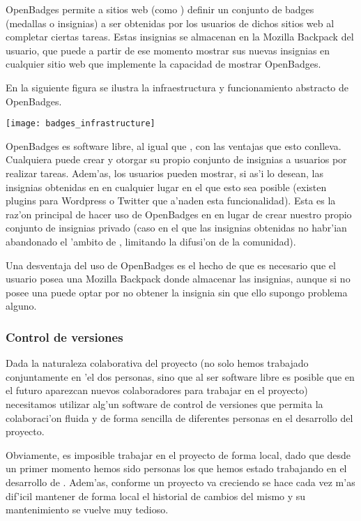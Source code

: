 OpenBadges permite a sitios web (como \Nipponline{}) definir un conjunto de badges (medallas o insignias) a ser 
obtenidas por los usuarios de dichos sitios web al completar ciertas tareas. Estas insignias se almacenan en la
Mozilla Backpack del usuario, que puede a partir de ese momento mostrar sus nuevas insignias en cualquier sitio web
que implemente la capacidad de mostrar OpenBadges. 

En la siguiente figura se ilustra la infraestructura\cite{mozillawiki}  y funcionamiento abstracto de 
OpenBadges.

\begin{center}
\texttt{[image: badges\_infrastructure]}
\end{center}

OpenBadges es software libre, al igual que \Nipponline{}, con las ventajas que esto conlleva. Cualquiera puede crear y
otorgar su propio conjunto de insignias a usuarios por realizar tareas.
Adem'as, los usuarios pueden mostrar, si as'i lo desean, las insignias obtenidas en \Nipponline{} en cualquier lugar en
el que esto sea posible (existen plugins para Wordpress o Twitter que a'naden esta  funcionalidad). Esta es la raz'on
principal de hacer uso de OpenBadges en \Nipponline{} en lugar de crear nuestro propio conjunto de insignias privado
(caso en el que las insignias obtenidas no habr'ian abandonado el 'ambito de \Nipponline{}, limitando la difusi'on de la
comunidad).

Una desventaja del uso de OpenBadges es el hecho de que es necesario que el usuario posea una Mozilla Backpack donde
almacenar las insignias, aunque si no posee una puede optar por no obtener la insignia sin que ello supongo problema
alguno. 

\subsubsection{Control de versiones}
\label{sub:control_de_versiones}

Dada la naturaleza colaborativa del proyecto \Nipponline{} (no solo hemos trabajado conjuntamente en 'el dos personas, 
sino que al ser software libre es posible que en el futuro aparezcan nuevos colaboradores para trabajar en el 
proyecto) necesitamos utilizar alg'un software de control de versiones que permita la colaboraci'on fluida y de forma
sencilla de diferentes personas en el desarrollo del proyecto.

Obviamente, es imposible trabajar en el proyecto de forma local, dado que desde un primer momento hemos sido personas
los que hemos estado trabajando en el desarrollo de \Nipponline{}. Adem'as, conforme un proyecto va creciendo se hace
cada vez m'as dif'icil mantener de forma local el historial de cambios del mismo y su mantenimiento se vuelve muy
tedioso.

